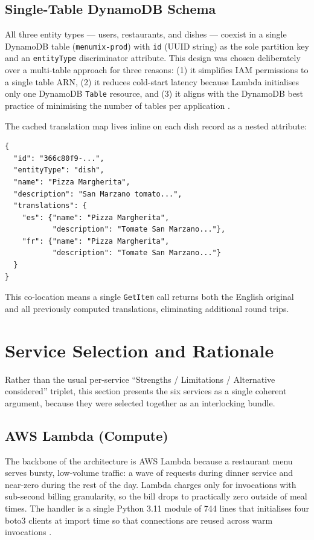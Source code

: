 \documentclass[conference]{IEEEtran}
\begin{document}
\subsection{Single-Table DynamoDB Schema}

All three entity types --- users, restaurants, and dishes --- coexist in a single DynamoDB table (\texttt{menumix-prod}) with \texttt{id} (UUID string) as the sole partition key and an \texttt{entityType} discriminator attribute. This design was chosen deliberately over a multi-table approach for three reasons: (1) it simplifies IAM permissions to a single table ARN, (2) it reduces cold-start latency because Lambda initialises only one DynamoDB \texttt{Table} resource, and (3) it aligns with the DynamoDB best practice of minimising the number of tables per application \cite{dynamodocs}.

The cached translation map lives inline on each dish record as a nested attribute:

\begin{lstlisting}[style=pycode]
{
  "id": "366c80f9-...",
  "entityType": "dish",
  "name": "Pizza Margherita",
  "description": "San Marzano tomato...",
  "translations": {
    "es": {"name": "Pizza Margherita",
           "description": "Tomate San Marzano..."},
    "fr": {"name": "Pizza Margherita",
           "description": "Tomate San Marzano..."}
  }
}
\end{lstlisting}

This co-location means a single \texttt{GetItem} call returns both the English original and all previously computed translations, eliminating additional round trips.

\section{Service Selection and Rationale}

Rather than the usual per-service ``Strengths / Limitations / Alternative considered'' triplet, this section presents the six services as a single coherent argument, because they were selected together as an interlocking bundle.

\subsection{AWS Lambda (Compute)}

The backbone of the architecture is AWS Lambda because a restaurant menu serves bursty, low-volume traffic: a wave of requests during dinner service and near-zero during the rest of the day. Lambda charges only for invocations with sub-second billing granularity, so the bill drops to practically zero outside of meal times. The handler is a single Python 3.11 module of 744 lines that initialises four boto3 clients at import time so that connections are reused across warm invocations \cite{lambdadocs}.
\end{document}
